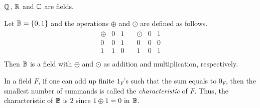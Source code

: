 \begin{example}
  $\mathbb{Q}$, $\mathbb{R}$ and $\mathbb{C}$ are fields.
\end{example}

\begin{example}
  Let $\mathbb{B} = \{0, 1\}$ and the operations $\oplus$ and $\odot$ are
  defined as follows.
  \begin{align*}
    \begin{array}{c|cc}
      \oplus & 0 & 1 \\
      \hline
      0      & 0 & 1 \\
      1      & 1 & 0 \\
    \end{array}
    \quad
    \begin{array}{c|cc}
      \odot & 0 & 1 \\
      \hline
      0     & 0 & 0 \\
      1     & 0 & 1 \\
    \end{array}
  \end{align*}
  Then $\mathbb{B}$ is a field with $\oplus$ and $\odot$ as addition and
  multiplication, respectively.
\end{example}

\begin{remark}
  In a field $F$, if one can add up finite $1_F$'s such that the sum equals to
  $0_F$, then the smallest number of summands is called the
  \emph{characteristic} of $F$.
  Thus, the characteristic of $\mathbb{B}$ is $2$ since $1 \oplus 1 = 0$ in $\mathbb{B}$.
\end{remark}

